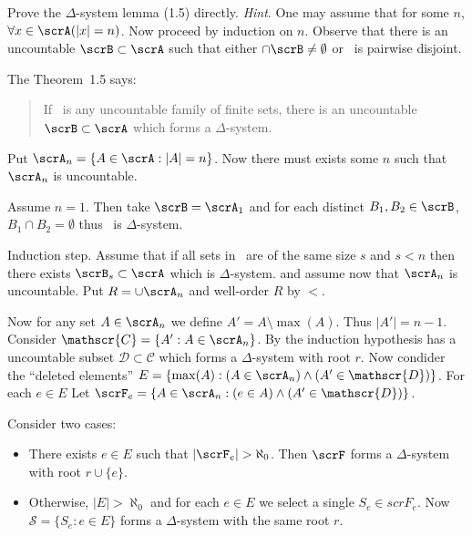 \begin{enumerate}

\begin{excopy}
Prove the \(\Delta\)-system lemma (1.5) directly. 
\emph{Hint}. One may assume that for
some $n$, \(\forall x \in \scrA (|x| =n)\). 
Now proceed by induction on $n$. Observe that
there is an uncountable \(\scrB \subset \scrA\) such that either 
\(\cap \scrB \neq \emptyset\) or \scrB\ is pairwise
disjoint.
\end{excopy}

The Theorem~1.5 says:
\begin{quote}
If \scrA\ is any uncountable family of finite sets, there is an uncountable
\(\scrB \subset \scrA\) which forms a \(\Delta\)-system.
\end{quote}
Put \(\scrA_n = \{A \in \scrA: |A|=n\}\).
Now there must exists some $n$ such that \(\scrA_n\) is uncountable.

Assume \(n=1\). Then take \(\scrB = \scrA_1\) 
and for each distinct \(B_1,B_2 \in \scrB\), \(B_1\cap B_2 = \emptyset\)
thus \scrB\ is \(\Delta\)-system.

Induction step.
Assume that if all sets in \scrA\ are of the same size $s$ and \(s<n\)
then there exists \(\scrB_s\subset \scrA\) which is \(\Delta\)-system.
and assume now that \(\scrA_n\) is uncountable.
Put \(R = \cup \scrA_n\) and well-order $R$ by $<$.

Now for any set \(A\in \scrA_n\) we define \(A' = A\setminus \max(A)\).
Thus \(|A'| = n - 1\). Consider \(\mathscr{C} = \{A': A\in\scrA_n\}\).
By the induction hypothesis has a uncountable
subset \(\mathscr{D}\subset\mathscr{C}\)
which forms a \(\Delta\)-system with root $r$.
Now condider the ``deleted elements''
\(E = \{\max(A): (A\in\scrA_n) \land (A'\in \mathscr{D})\}\).
For each \(e\in E\) Let
\(\scrF_e = \{A\in \scrA_n: (e\in A) \land (A'\in\mathscr{D})\}\).

Consider two cases:
\begin{itemize}
\item There exists \(e\in E\) such that \(|\scrF_e|>\aleph_0\).
Then \(\scrF\) forms a \(\Delta\)-system with root \(r\cup\{e\}\).
\item Otherwise, \(|E|>\aleph_0\) and for each \(e\in E\)
we select a single \(S_e\in scrF_e\). Now \(\mathscr{S} = \{S_e: e\in E\}\)
forms a  \(\Delta\)-system with the same root $r$.
\end{itemize}

\end{enumerate}
